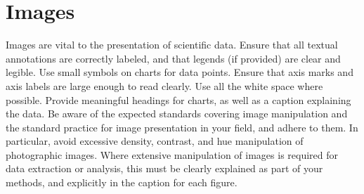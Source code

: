 \section{Images}

Images are vital to the presentation of scientific data.  Ensure that all textual annotations are correctly labeled, and that legends (if provided) are clear and legible.  Use small symbols on charts for data points.  Ensure that axis marks and axis labels are large enough to read clearly.  Use all the white space where possible.  Provide meaningful headings for charts, as well as a caption explaining the data. Be aware of the expected standards covering image manipulation and the standard practice for image presentation in your field, and adhere to them.  In particular, avoid excessive density, contrast, and hue manipulation of photographic images.  Where extensive manipulation of images is required for data extraction or analysis, this must be clearly explained as part of your methods, and explicitly in the caption for each figure.
